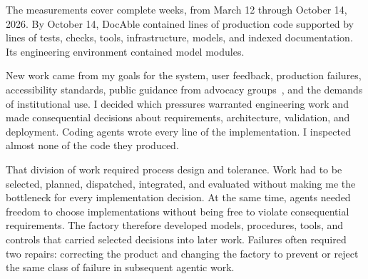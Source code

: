 The measurements cover  complete weeks, from March 12 through October 14, 2026. By October 14, DocAble contained  lines of production code supported by  lines of tests, checks, tools, infrastructure, models, and indexed documentation. Its engineering environment contained  model modules.


New work came from my goals for the system, user feedback, production failures, accessibility standards, public guidance from advocacy groups~\citep{nfb-accessible-documents-2014}, and the demands of institutional use. I decided which pressures warranted engineering work and made consequential decisions about requirements, architecture, validation, and deployment. Coding agents wrote every line of the implementation. I inspected almost none of the code they produced.


That division of work required process design and tolerance. Work had to be selected, planned, dispatched, integrated, and evaluated without making me the bottleneck for every implementation decision. At the same time, agents needed freedom to choose implementations without being free to violate consequential requirements. The factory therefore developed models, procedures, tools, and controls that carried selected decisions into later work. Failures often required two repairs: correcting the product and changing the factory to prevent or reject the same class of failure in subsequent agentic work.

